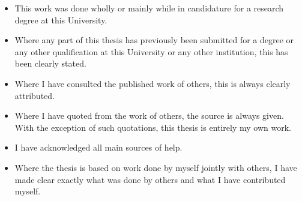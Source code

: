 \documentclass[12pt]{witseiepaper}
\begin{document}
\begin{itemize} 
\item This work was done wholly or mainly while in candidature for a research degree at this University. \\
\item Where any part of this thesis has previously been submitted for a degree or any other qualification at this University or any other institution, this has been clearly stated. \\
\item Where I have consulted the published work of others, this is always clearly attributed. \\
\item Where I have quoted from the work of others, the source is always given. With the exception of such quotations, this thesis is entirely my own work. \\
\item I have acknowledged all main sources of help. \\
\item Where the thesis is based on work done by myself jointly with others, I have made clear exactly what was done by others and what I have contributed myself.\\ [1.5cm]
\end{itemize}




\clearpage %





\end{document}
